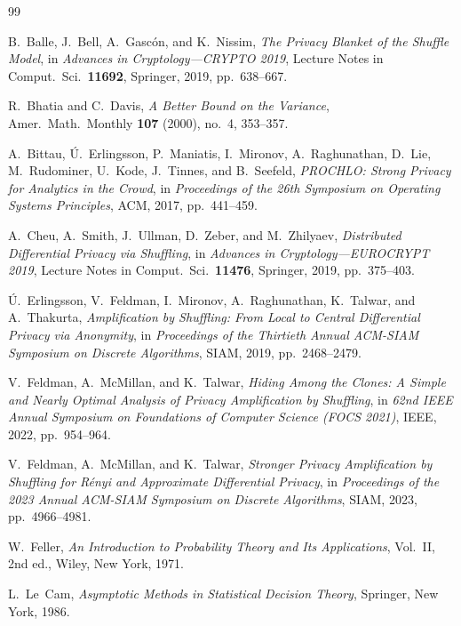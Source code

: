 \documentclass[11pt]{amsart}
\numberwithin{equation}{section}
\theoremstyle{definition}
\begin{document}
\begin{thebibliography}{99}

B.~Balle, J.~Bell, A.~Gasc\'on, and K.~Nissim,
\emph{The Privacy Blanket of the Shuffle Model},
in \emph{Advances in Cryptology---CRYPTO 2019},
Lecture Notes in Comput.\ Sci.\ \textbf{11692},
Springer, 2019, pp.~638--667.

R.~Bhatia and C.~Davis,
\emph{A Better Bound on the Variance},
Amer.\ Math.\ Monthly \textbf{107} (2000), no.~4, 353--357.

A.~Bittau, \'U.~Erlingsson, P.~Maniatis, I.~Mironov, A.~Raghunathan, D.~Lie,
M.~Rudominer, U.~Kode, J.~Tinnes, and B.~Seefeld,
\emph{PROCHLO: Strong Privacy for Analytics in the Crowd},
in \emph{Proceedings of the 26th Symposium on Operating Systems Principles},
ACM, 2017, pp.~441--459.

A.~Cheu, A.~Smith, J.~Ullman, D.~Zeber, and M.~Zhilyaev,
\emph{Distributed Differential Privacy via Shuffling},
in \emph{Advances in Cryptology---EUROCRYPT 2019},
Lecture Notes in Comput.\ Sci.\ \textbf{11476},
Springer, 2019, pp.~375--403.

\'U.~Erlingsson, V.~Feldman, I.~Mironov, A.~Raghunathan, K.~Talwar, and
A.~Thakurta,
\emph{Amplification by Shuffling: From Local to Central Differential Privacy via Anonymity},
in \emph{Proceedings of the Thirtieth Annual ACM-SIAM Symposium on Discrete Algorithms},
SIAM, 2019, pp.~2468--2479.

V.~Feldman, A.~McMillan, and K.~Talwar,
\emph{Hiding Among the Clones: A Simple and Nearly Optimal Analysis of Privacy Amplification by Shuffling},
in \emph{62nd IEEE Annual Symposium on Foundations of Computer Science (FOCS 2021)},
IEEE, 2022, pp.~954--964.

V.~Feldman, A.~McMillan, and K.~Talwar,
\emph{Stronger Privacy Amplification by Shuffling for R\'enyi and Approximate Differential Privacy},
in \emph{Proceedings of the 2023 Annual ACM-SIAM Symposium on Discrete Algorithms},
SIAM, 2023, pp.~4966--4981.

W.~Feller,
\emph{An Introduction to Probability Theory and Its Applications}, Vol.~II,
2nd ed., Wiley, New York, 1971.

L.~Le~Cam,
\emph{Asymptotic Methods in Statistical Decision Theory},
Springer, New York, 1986.


\end{thebibliography}
\end{document}
